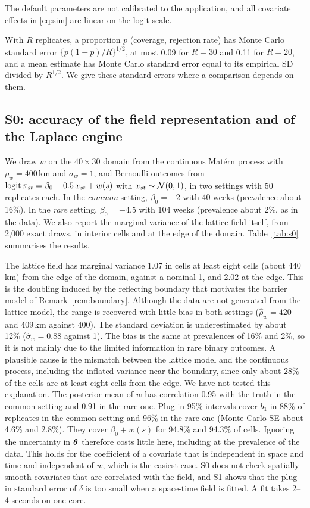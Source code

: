 The default parameters are not calibrated to the application, and all covariate
effects in \eqref{eq:sim} are linear on the logit scale.

With $R$ replicates, a proportion $p$ (coverage, rejection rate) has Monte Carlo
standard error $\{p(1-p)/R\}^{1/2}$, at most 0.09 for $R = 30$ and 0.11 for $R = 20$, and
a mean estimate has Monte Carlo standard error equal to its empirical SD divided by
$R^{1/2}$. We give these standard errors where a comparison depends on them.

\subsection{S0: accuracy of the field representation and of the Laplace engine}\label{sec:sim-engine}

We draw $w$ on the $40 \times 30$ domain from the continuous Mat\'ern process with
$\rho_w = 400$\,km and $\sigma_w = 1$, and Bernoulli outcomes from
$\operatorname{logit}\pi_{st} = \beta_0 + 0.5\,x_{st} + w(s)$ with $x_{st} \sim \mathcal{N}(0,1)$, in two
settings with 50 replicates each. In the \emph{common} setting, $\beta_0 = -2$ with 40
weeks (prevalence about 16\%). In the \emph{rare} setting, $\beta_0 = -4.5$ with 104
weeks (prevalence about 2\%, as in the data). We also report the marginal variance of
the lattice field itself, from 2{,}000 exact draws, in interior cells and at the edge
of the domain. Table~\ref{tab:s0} summarises the results.

The lattice field has marginal variance 1.07 in cells at least eight cells (about
440\,km) from the edge of the domain, against a nominal 1, and 2.02 at the edge. This is
the doubling induced by the reflecting boundary that motivates the barrier model of
Remark~\ref{rem:boundary}. Although the data are not generated from the lattice model,
the range is recovered with little bias in both settings ($\hat\rho_w = 420$ and
409\,km against 400). The standard deviation is underestimated by about 12\%
($\hat\sigma_w = 0.88$ against 1). The bias is the same at prevalences of 16\% and
2\%, so it is not mainly due to the limited information in rare binary outcomes. A
plausible cause is the mismatch between the lattice model and the continuous process,
including the inflated variance near the boundary, since only about 28\% of the cells
are at least eight cells from the edge. We have not tested this explanation. The
posterior mean of $w$ has correlation 0.95 with the truth in the common setting and
0.91 in the rare one. Plug-in 95\% intervals cover $b_1$ in 88\% of replicates in the
common setting and 96\% in the rare one (Monte Carlo SE about 4.6\% and 2.8\%). They
cover $\beta_0 + w(s)$ for 94.8\% and 94.3\% of cells. Ignoring the uncertainty in
$\bm{\theta}$ therefore costs little here, including at the prevalence of the data. This
holds for the coefficient of a covariate that is independent in space and time and
independent of $w$, which is the easiest case. S0 does not check spatially smooth
covariates that are correlated with the field, and S1 shows that the plug-in standard
error of $\delta$ is too small when a space-time field is fitted. A fit takes 2--4
seconds on one core.

